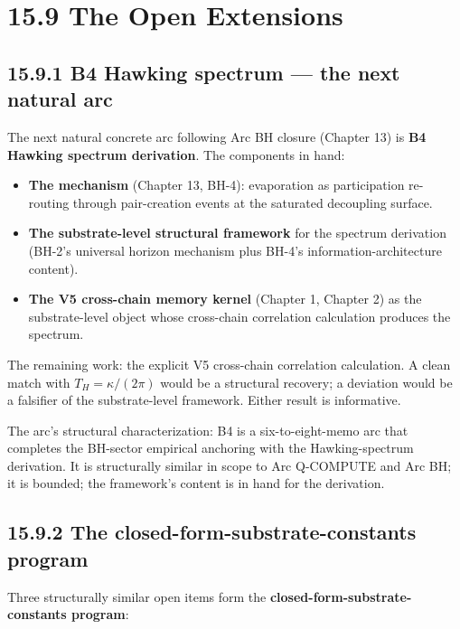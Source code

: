 \documentclass[11pt]{book}
\begin{document}
\section{15.9 The Open Extensions}

\subsection{15.9.1 B4 Hawking spectrum — the next natural arc}

The next natural concrete arc following Arc BH closure (Chapter 13) is \textbf{B4 Hawking spectrum derivation}. The components in hand:

\begin{itemize}
\item \textbf{The mechanism} (Chapter 13, BH-4): evaporation as participation re-routing through pair-creation events at the saturated decoupling surface.
\item \textbf{The substrate-level structural framework} for the spectrum derivation (BH-2's universal horizon mechanism plus BH-4's information-architecture content).
\item \textbf{The V5 cross-chain memory kernel} (Chapter 1, Chapter 2) as the substrate-level object whose cross-chain correlation calculation produces the spectrum.
\end{itemize}

The remaining work: the explicit V5 cross-chain correlation calculation. A clean match with $T_H = \kappa/(2\pi)$ would be a structural recovery; a deviation would be a falsifier of the substrate-level framework. Either result is informative.

The arc's structural characterization: B4 is a six-to-eight-memo arc that completes the BH-sector empirical anchoring with the Hawking-spectrum derivation. It is structurally similar in scope to Arc Q-COMPUTE and Arc BH; it is bounded; the framework's content is in hand for the derivation.

\subsection{15.9.2 The closed-form-substrate-constants program}

Three structurally similar open items form the \textbf{closed-form-substrate-constants program}:
\end{document}
